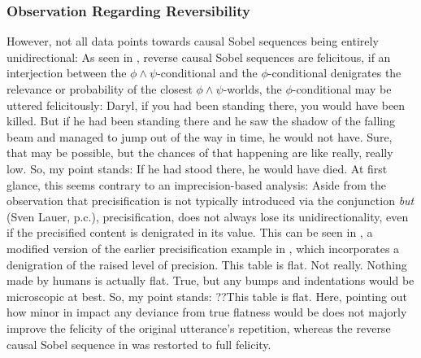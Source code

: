 \subsubsection{Observation Regarding Reversibility}
However, not all data points towards causal Sobel sequences being entirely unidirectional: As seen in , reverse causal Sobel sequences are felicitous, if an interjection between the $\phi\land\psi$-conditional and the $\phi$-conditional denigrates the relevance or probability of the closest $\phi\land\psi$-worlds, the $\phi$-conditional may be uttered felicitously: 
\pex{}%
	\a	{}Daryl, if you had been standing there, you would have been killed.
	\a{}But if he had been standing there and he saw the shadow of the falling beam and managed to jump out of the way in time, he would not have.
	\a{}Sure, that may be possible, but the chances of that happening are like really, really low. So, my point stands: If he had stood there, he would have died.\hfill\parencite[adapted and modified from][p. 134]{Klecha2014}
\xe
At first glance, this seems contrary to an imprecision-based analysis: Aside from the observation that precisification is not typically introduced via the conjunction \textit{but} (Sven Lauer, p.c.), precisification, does not always lose its unidirectionality, even if the precisified content is denigrated in its value. This can be seen in , a modified version of the earlier precisification example in , which incorporates a denigration of the raised level of precision.
\pex{}%
\a{}This table is flat.
\a{}Not really. Nothing made by humans is actually flat.
\a{}True, but any bumps and indentations would be microscopic at best. So, my point stands: ??This table is flat. 
\xe
Here, pointing out how minor in impact any deviance from true flatness would be does not majorly improve the felicity of the original utterance's repetition, whereas the reverse causal Sobel sequence in  was restorted to full felicity.


